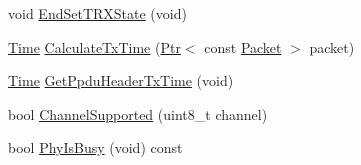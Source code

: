 \begin{DoxyCompactItemize}
\item 
void \hyperlink{classns3_1_1LrWpanPhy_ab240816e20a6d8c7916b5670ad65c492}{End\+Set\+T\+R\+X\+State} (void)
\item 
\hyperlink{classns3_1_1Time}{Time} \hyperlink{classns3_1_1LrWpanPhy_a18e8110831088f2f0ef3e55b9400526e}{Calculate\+Tx\+Time} (\hyperlink{classns3_1_1Ptr}{Ptr}$<$ const \hyperlink{classns3_1_1Packet}{Packet} $>$ packet)
\item 
\hyperlink{classns3_1_1Time}{Time} \hyperlink{classns3_1_1LrWpanPhy_a8b4b00f2f8452d6b22b8ce3e1bc316d6}{Get\+Ppdu\+Header\+Tx\+Time} (void)
\item 
bool \hyperlink{classns3_1_1LrWpanPhy_a135ee9e3575b3e831323721373fc5176}{Channel\+Supported} (uint8\+\_\+t channel)
\item 
bool \hyperlink{classns3_1_1LrWpanPhy_a70e40ec5f6dc98092c6d4bcf7ee137a6}{Phy\+Is\+Busy} (void) const 
\end{DoxyCompactItemize}
